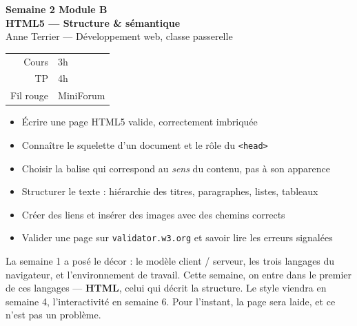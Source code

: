 \documentclass[a4paper,11pt]{article}
\begin{document}

\begin{tcolorbox}[
  colback=accentBlue, colframe=accentBlue,
  arc=4pt, left=12pt, right=12pt, top=10pt, bottom=10pt]
  \begin{minipage}{0.70\linewidth}
    {\color{cfptYellow}\Large\bfseries Semaine 2 \quad\textbar\quad Module B}\\[4pt]
    {\color{white}\Large\bfseries HTML5 --- Structure \& sémantique}\\[4pt]
    {\color{lightBlue}\normalsize Anne Terrier --- Développement web, classe passerelle}
  \end{minipage}
  \hfill
  \begin{minipage}{0.24\linewidth}
    \raggedleft
    \begin{tabular}{rl}
      \color{lightBlue}\small Cours & \color{white}\small 3h \\
      \color{lightBlue}\small TP    & \color{white}\small 4h \\
      \color{lightBlue}\small Fil rouge & \color{white}\small MiniForum \\
    \end{tabular}
  \end{minipage}
\end{tcolorbox}

\vspace{6pt}
\begin{tcolorbox}[definition, title={Objectifs de la semaine}]
\begin{itemize}
  \item Écrire une page HTML5 valide, correctement imbriquée
  \item Connaître le squelette d'un document et le rôle du \texttt{<head>}
  \item Choisir la balise qui correspond au \textit{sens} du contenu, pas à son apparence
  \item Structurer le texte : hiérarchie des titres, paragraphes, listes, tableaux
  \item Créer des liens et insérer des images avec des chemins corrects
  \item Valider une page sur \texttt{validator.w3.org} et savoir lire les erreurs signalées
\end{itemize}
\end{tcolorbox}

\vspace{4pt}
\begin{tcolorbox}[astuce, title={Où en sommes-nous ?}]
La semaine 1 a posé le décor : le modèle client / serveur, les trois langages du navigateur, et l'environnement de travail. Cette semaine, on entre dans le premier de ces langages --- \textbf{HTML}, celui qui décrit la structure. Le style viendra en semaine 4, l'interactivité en semaine 6. Pour l'instant, la page sera laide, et ce n'est pas un problème.
\end{tcolorbox}
\end{document}
